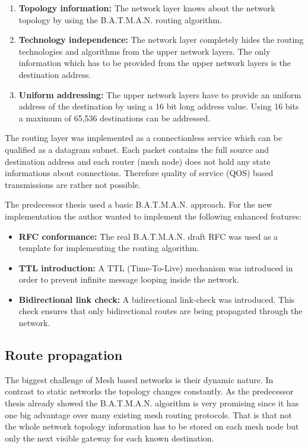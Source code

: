 \begin{enumerate}
    \item \textbf{Topology information:} The network layer knows about the network topology by using the B.A.T.M.A.N. routing algorithm.
    \item \textbf{Technology independence:} The network layer completely hides the routing technologies and algorithms from the upper network layers. The only information which has to be provided from the upper network layers is the destination address.
    \item \textbf{Uniform addressing:} The upper network layers have to provide an uniform address of the destination by using a 16 bit long address value. Using 16 bits a maximum of 65,536 destinations can be addressed.
\end{enumerate}

The routing layer was implemented as a connectionless service which can be qualified as a datagram subnet. Each packet contains the full source and destination address and each router (mesh node) does not hold any state informations about connections. Therefore quality of service (QOS) based transmissions are rather not possible.

The predecessor thesis used a basic B.A.T.M.A.N. approach. For the new implementation the author wanted to implement the following enhanced features:

\begin{itemize}
    \item \textbf{RFC conformance:} The real B.A.T.M.A.N. draft RFC \cite{batmanrfc} was used as a template for implementing the routing algorithm.
    \item \textbf{TTL introduction:} A TTL (Time-To-Live) mechanism was introduced in order to prevent infinite message looping inside the network.
    \item \textbf{Bidirectional link check:} A bidirectional link-check was introduced. This check ensures that only bidirectional routes are being propagated through the network.
\end{itemize}

\subsection{Route propagation}%
The biggest challenge of Mesh based networks is their dynamic nature. In contrast to static networks the topology changes constantly. As the predecessor thesis already showed the B.A.T.M.A.N. algorithm is very promising since it has one big advantage over many existing mesh routing protocols. That is that not the whole network topology information has to be stored on each mesh node but only the next visible gateway for each known destination.

